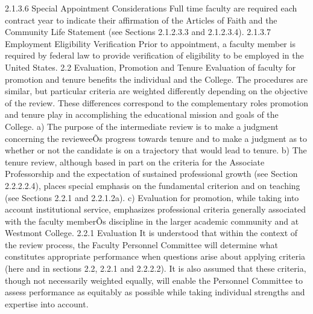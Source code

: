 \documentclass[letterpaper, 11pt]{article}
\begin{document}
	2.1.3.6 Special Appointment Considerations
	Full time faculty are required each contract year to indicate their affirmation of the Articles of Faith and the Community Life Statement (see Sections 2.1.2.3.3 and 2.1.2.3.4).
	2.1.3.7 Employment Eligibility Verification
	Prior to appointment, a faculty member is required by federal law to provide verification of eligibility to be employed in the United States.
	2.2 Evaluation, Promotion and Tenure
	Evaluation of faculty for promotion and tenure benefits the individual and the College. The procedures are similar, but particular criteria are weighted differently depending on the objective of the review.  These differences correspond to the complementary roles promotion and tenure play in accomplishing the educational mission and goals of the College.
	a) The purpose of the intermediate review is to make a judgment concerning the revieweeÕs progress towards tenure and to make a judgment as to whether or not the candidate is on a trajectory that would lead to tenure.
	b) The tenure review, although based in part on the criteria for the Associate Professorship and the expectation of sustained professional growth (see Section 2.2.2.2.4), places special emphasis on the fundamental criterion and on teaching (see Sections 2.2.1 and 2.2.1.2a).
	c) Evaluation for promotion, while taking into account institutional service, emphasizes professional criteria generally associated with the faculty memberÕs discipline in the larger academic community and at Westmont College.
	2.2.1 Evaluation
	It is understood that within the context of the review process, the Faculty Personnel Committee will determine what constitutes appropriate performance when questions arise about applying criteria (here and in sections 2.2, 2.2.1 and 2.2.2.2).  It is also assumed that these criteria, though not necessarily weighted equally, will enable the Personnel Committee to assess performance as equitably as possible while taking individual strengths and expertise into account.
\end{document}
